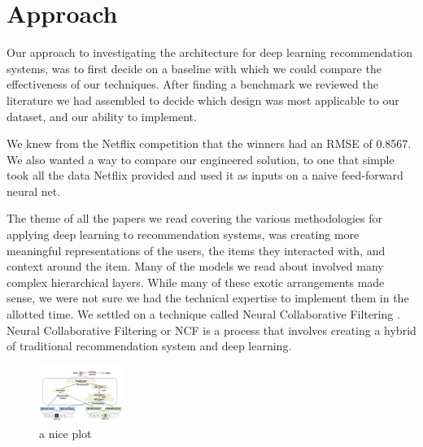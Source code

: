 \section{Approach}

Our approach to investigating the architecture for deep learning recommendation systems, was to first decide on a baseline with which we could compare the effectiveness of our techniques. After finding a benchmark we reviewed the literature we had assembled to decide which design was most applicable to our dataset, and our ability to implement.

 We knew from the Netflix competition that the winners had an RMSE of 0.8567. We also wanted a way to compare our engineered solution, to one that simple took all the data Netflix provided and used it as inputs on a naive feed-forward neural net. 

 The theme of all the papers we read covering the various methodologies for applying deep learning to recommendation systems, was creating more meaningful representations of the users, the items they interacted with, and context around the item. Many of the models we read about involved many complex hierarchical layers. While many of these exotic arrangements made sense, we were not sure we had the technical expertise to implement them in the allotted time. We settled on a technique called Neural Collaborative Filtering \cite{He2017}. Neural Collaborative Filtering or NCF is a process that involves creating a hybrid of traditional recommendation system and deep learning. 

 \begin{figure}[h]
    \centering
    \includegraphics[width=0.25\textwidth]{images/NCF_diagram.png}
    \caption{a nice plot}
    \label{fig:NCF diagram}
\end{figure}
